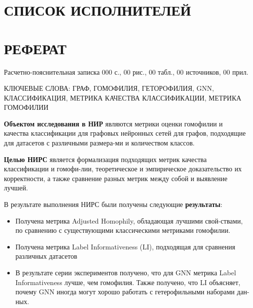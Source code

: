 \documentclass[a4paper,14pt]{article}
\begin{document}
    

    \section*{\hfill СПИСОК ИСПОЛНИТЕЛЕЙ \hfill}
    \newpage
    
    \section*{\hfill РЕФЕРАТ \hfill}
    
    Расчетно-пояснительная записка 000 с., 00 рис., 00 табл., 00 источников, 00 прил.
    
    КЛЮЧЕВЫЕ СЛОВА: ГРАФ, ГОМОФИЛИЯ, ГЕТОРОФИЛИЯ, GNN, КЛАССИФИКАЦИЯ, МЕТРИКА КАЧЕСТВА КЛАССИФИКАЦИИ, МЕТРИКА ГОМОФИЛИИ 
    
    \textbf{Объектом исследования в  НИР} являются метрики оценки гомофилии и качества классификации для графовых нейронных сетей для графов, подходящие для датасетов с различными размера-ми и количеством классов.
    
    \textbf{Целью НИРС} является формализация подходящих метрик качества классификации и гомофи-лии, теоретическое и эмпирическое доказательство их корректности, а также сравнение разных метрик между собой и выявление лучшей. 
    
    
    В результате выполнения НИРС были получены следующие \textbf{результаты}:
    
    \begin{itemize}
    	\item Получена метрика Adjusted Homophily, обладающая лучшими свой-ствами, по сравнению с существующими классическими метриками гомофилии. 
    
    	\item Получена метрика Label Informativeness (LI), подходящая для сравнения различных датасетов 
    
    	\item В результате серии экспериментов получено, что  для  GNN метрика Label Informativeness лучше, чем гомофилия.
    	Также получено, что LI объясняет, почему GNN иногда могут хорошо работать с гетерофильными наборами дан-ных.
\end{itemize}

  
    \newpage
    
    \tableofcontents
    \pagebreak
    
\end{document}
